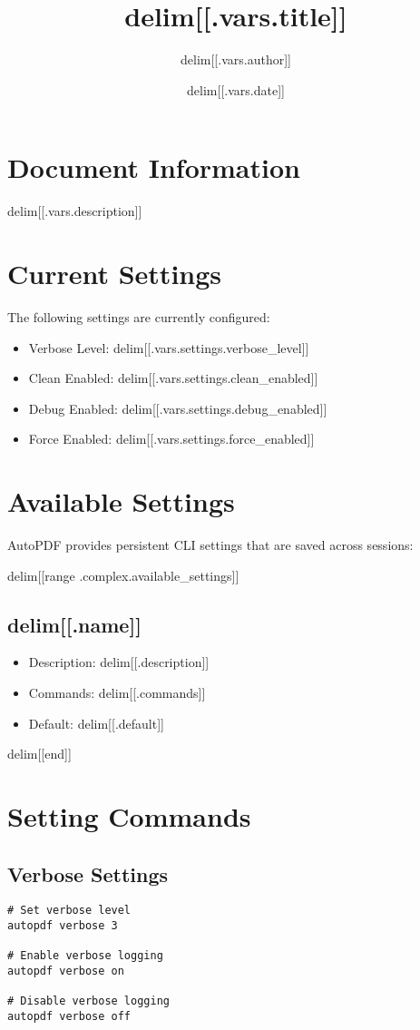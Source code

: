 \documentclass{article}
\title{delim[[.vars.title]]}
\author{delim[[.vars.author]]}
\date{delim[[.vars.date]]}
\begin{document}
\maketitle

\section{Document Information}
delim[[.vars.description]]

\section{Current Settings}
The following settings are currently configured:

\begin{itemize}
\item Verbose Level: delim[[.vars.settings.verbose_level]]
\item Clean Enabled: delim[[.vars.settings.clean_enabled]]
\item Debug Enabled: delim[[.vars.settings.debug_enabled]]
\item Force Enabled: delim[[.vars.settings.force_enabled]]
\end{itemize}

\section{Available Settings}
AutoPDF provides persistent CLI settings that are saved across sessions:

delim[[range .complex.available_settings]]
\subsection{delim[[.name]]}
\begin{itemize}
\item Description: delim[[.description]]
\item Commands: delim[[.commands]]
\item Default: delim[[.default]]
\end{itemize}
delim[[end]]

\section{Setting Commands}
\subsection{Verbose Settings}
\begin{verbatim}
# Set verbose level
autopdf verbose 3

# Enable verbose logging
autopdf verbose on

# Disable verbose logging
autopdf verbose off
\end{verbatim}
\end{document}
